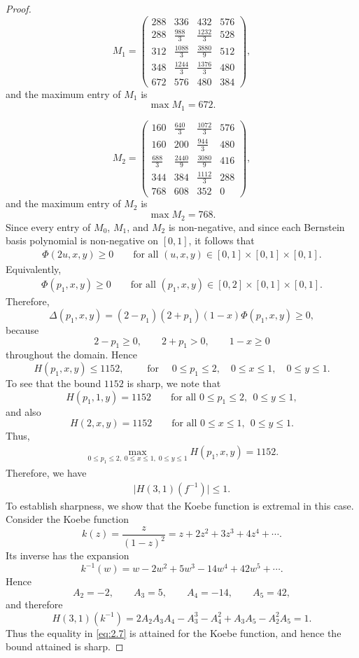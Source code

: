 \documentclass[a4paper,12pt,reqno]{amsart}
\numberwithin{equation}{section}
\begin{document}
\begin{proof}
		\[
		M_{1}=
		\begin{pmatrix}
			288&336&432&576\\[3mm]
			288&\frac{988}{3}&\frac{1232}{3}&528\\[3mm]
			312&\frac{1088}{3}&\frac{3880}{9}&512\\[3mm]
			348&\frac{1244}{3}&\frac{1376}{3}&480\\[3mm]
			672&576&480&384
		\end{pmatrix},
		\]
		and the maximum entry of \(M_{1}\) is
		\[
		\max M_{1}=672.
		\]
		
		\[
		M_{2}=
		\begin{pmatrix}
			160&\frac{640}{3}&\frac{1072}{3}&576\\[3mm]
			160&200&\frac{944}{3}&480\\[3mm]
			\frac{688}{3}&\frac{2440}{9}&\frac{3080}{9}&416\\[3mm]
			344&384&\frac{1112}{3}&288\\[3mm]
			768&608&352&0
		\end{pmatrix},
		\]
		and the maximum entry of \(M_{2}\) is
		\[
		\max M_{2}=768.
		\]
		Since every entry of \(M_{0}\), \(M_{1}\), and \(M_{2}\) is non-negative, and since each Bernstein basis polynomial is non-negative on \([0,1]\), it follows that
		\begin{align*}
		\Phi(2u,x,y)\ge 0
		\qquad \text{for all } (u,x,y)\in[0,1]\times[0, 1]\times[0, 1].
		\end{align*}
		Equivalently,
		\begin{align*}
		\Phi(p_{1},x,y)\ge 0
		\qquad \text{for all } (p_{1},x,y)\in[0,2]\times[0,1]\times[0,1].
		\end{align*}
		Therefore,
		\[
		\Delta(p_{1},x,y)
		=(2-p_{1})(2+p_{1})(1-x)\Phi(p_{1},x,y)\ge 0,
		\]
		because
		\[
		2-p_{1}\ge 0,\qquad 2+p_{1}>0,\qquad 1-x\ge 0
		\]
		throughout the domain. Hence
		\[
		H(p_{1},x,y)\le 1152, \qquad \text{ for } \quad 0\le p_{1}\le 2,\quad 0\le x\le 1,\quad 0\le y\le 1.
		\]
		To see that the bound $1152$ is sharp, we note that
		\[
		H(p_{1},1,y)=1152
		\qquad \text{for all } 0\le p_{1}\le 2,\ \ 0\le y\le 1,
		\]
		and also
		\[
		H(2,x,y)=1152
		\qquad \text{for all } 0\le x\le 1,\ \ 0\le y\le 1.
		\]
		Thus,
		\begin{align*}
		\max_{0\le p_{1}\le 2,\;0\le x\le 1,\;0\le y\le 1} H(p_{1},x,y)=1152.
		\end{align*}
	Therefore, we have
	\begin{align}\label{eq:2.7}
	\bigl|H(3,1)(f^{-1})\bigr|\le 1.
	\end{align}
To establish sharpness, we show that the Koebe function is extremal in this case. Consider the Koebe function
	\[
	k(z)=\frac{z}{(1-z)^{2}}=z+2z^{2}+3z^{3}+4z^{4}+\cdots .
	\]
	Its inverse has the expansion
	\[
	k^{-1}(w)=w-2w^{2}+5w^{3}-14w^{4}+42w^{5}+\cdots .
	\]
	Hence
	\[
	A_{2}=-2,\qquad A_{3}=5,\qquad A_{4}=-14,\qquad A_{5}=42,
	\]
	and therefore
	\[
	H(3,1)(k^{-1})
	=
	2A_{2}A_{3}A_{4}-A_{3}^{3}-A_{4}^{2}+A_{3}A_{5}-A_{2}^{2}A_{5}
	=1.
	\]
	Thus the equality in \eqref{eq:2.7} is attained for the Koebe function, and hence the bound attained is sharp. 
	\end{proof}
	\bigskip
	
\end{document}
